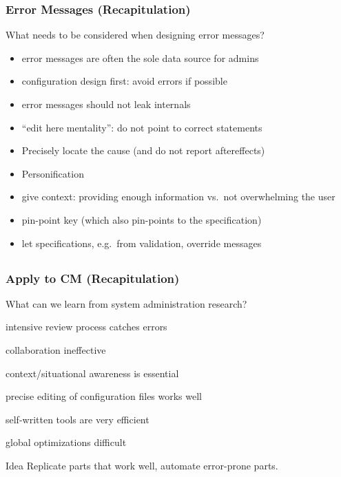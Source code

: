 \begin{frame}
	\frametitle{Error Messages (Recapitulation)}

	\begin{task}
	What needs to be considered when designing error messages?
	\end{task}

	\pause

	\begin{itemize} %
	\item error messages are often the sole data source for admins
	\item configuration design first: avoid errors if possible
	\item error messages should not leak internals~\cite{brown1983error}
	\item ``edit here mentality'': do not point to correct statements~\cite{marceau2011mind}
	\item Precisely locate the cause (and do not report aftereffects)
	\item Personification~\cite{lee2011personifying}
	\item give context: providing enough information vs.\ not overwhelming the user~\cite{wrenn2017error}

	\item pin-point key (which also pin-points to the specification)
	\item let specifications, e.g.\ from validation, override messages
	\end{itemize}
\end{frame}




\subsection{}


\begin{frame}
	\frametitle{Apply to CM (Recapitulation)}

	What can we learn from system administration research?

	\begin{description}[<+-| alert@+>]
	\item[$+$] intensive review process catches errors
	\item[$-$] collaboration ineffective
	\item[$-$] context/situational awareness is essential
	\item[$+$] precise editing of configuration files works well
	\item[$+$] self-written tools are very efficient
	\item[$-$] global optimizations difficult
	\end{description}

	\pause[\thebeamerpauses]  %

	\begin{alertblock}{Idea}
	Replicate parts that work well, automate error-prone parts.
	\end{alertblock}
\end{frame}

